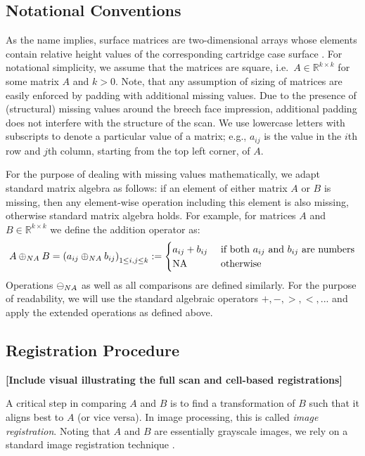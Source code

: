 \documentclass[11pt,]{isuthesis}
\begin{document}
\hypertarget{notational-conventions}{%
\subsection{Notational Conventions}\label{notational-conventions}}

As the name implies, surface matrices are two-dimensional arrays whose elements contain relative height values of the corresponding cartridge case surface \citep{ISO25178-72}.
For notational simplicity, we assume that the matrices are square, i.e.~\(A \in \mathbb{R}^{k \times k}\) for some matrix \(A\) and \(k > 0\).
Note, that any assumption of sizing of matrices are easily enforced by padding with additional missing values. Due to the presence of (structural) missing values around the breech face impression, additional padding does not interfere with the structure of the scan.
We use lowercase letters with subscripts to denote a particular value of a matrix; e.g., \(a_{ij}\) is the value in the \(i\)th row and \(j\)th column, starting from the top left corner, of \(A\).

For the purpose of dealing with missing values mathematically, we adapt standard matrix algebra as follows: if an element of either matrix \(A\) or \(B\) is missing, then any element-wise operation including this element is also missing, otherwise standard matrix algebra holds.
For example, for matrices \(A\) and \(B \in \mathbb{R}^{k \times k}\) we define the addition operator as:
\[
A \oplus_{\tiny{NA}} B = \left( a_{ij} \oplus_{\tiny{NA}} b_{ij} \right)_{1 \le i,j \le k} :=
\begin{cases}
a_{ij} + b_{ij} & \text{ if both } a_{ij} \text{ and } b_{ij} \text{ are numbers}\\
\text{NA } & \text{ otherwise}
\end{cases}
\]
Operations \(\ominus_{\tiny{NA}}\) as well as all comparisons are defined similarly. For the purpose of readability, we will use the standard algebraic operators \(+, -, >, <, ...\) and apply the extended operations as defined above.

\hypertarget{registration-procedure}{%
\subsection{Registration Procedure}\label{registration-procedure}}

\textbf{{[}Include visual illustrating the full scan and cell-based registrations{]}}

A critical step in comparing \(A\) and \(B\) is to find a transformation of \(B\) such that it aligns best to \(A\) (or vice versa).
In image processing, this is called \emph{image registration}. Noting that \(A\) and \(B\) are essentially grayscale images, we rely on a standard image registration technique \citep{Brown1992}.
\end{document}
